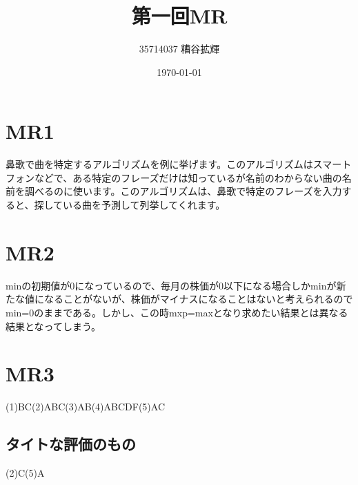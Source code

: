 \documentclass{article}
\title{第一回MR}
\author{35714037 糟谷拡輝}
\date{\today}
\begin{document}
\maketitle
\section{MR1}
鼻歌で曲を特定するアルゴリズムを例に挙げます。このアルゴリズムはスマートフォンなどで、ある特定のフレーズだけは知っているが名前のわからない曲の名前を調べるのに使います。このアルゴリズムは、鼻歌で特定のフレーズを入力すると、探している曲を予測して列挙してくれます。
\section{MR2}
minの初期値が0になっているので、毎月の株価が0以下になる場合しかminが新たな値になることがないが、株価がマイナスになることはないと考えられるのでmin=0のままである。しかし、この時mxp=maxとなり求めたい結果とは異なる結果となってしまう。
\section{MR3}
(1)BC(2)ABC(3)AB(4)ABCDF(5)AC
\subsection*{タイトな評価のもの}
(2)C(5)A
\end{document}
